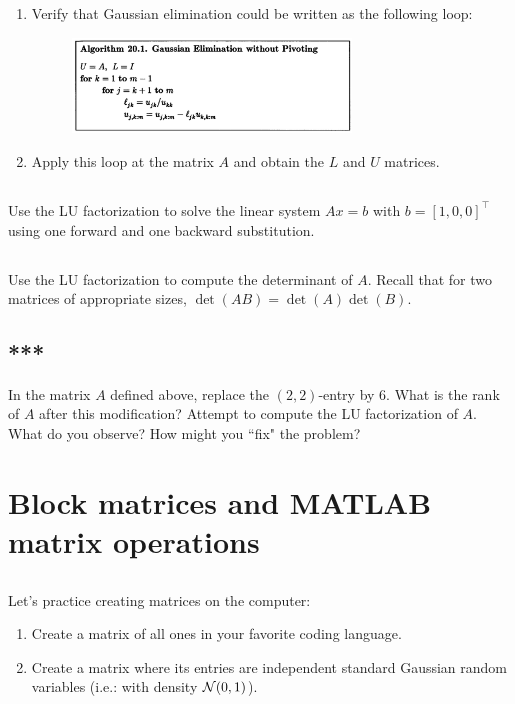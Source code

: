 \documentclass[11pt,letterpaper]{report}
\begin{document}
\begin{enumerate}
    \item Verify that Gaussian elimination could be written as the following loop:
    \begin{figure}[H]
        \centering
        \includegraphics[width = 0.7\textwidth]{Session_2/latex/figs/TB97_Guass_wo_piv}
    \end{figure}
    \item Apply this loop at the matrix $A$ and obtain the $L$ and $U$ matrices.
\end{enumerate}

\subsection{}
Use the LU factorization to solve the linear system $Ax=b$ with
  $b=[1, 0, 0]^\top$ using one forward and one backward substitution.
  
\subsection{}\label{sec:3.1d}
Use the LU factorization to compute the determinant of
$A$. Recall that for two matrices of appropriate sizes,
$\det(AB)=\det(A)\det(B)$.
  
\subsection{***}
In the matrix $A$ defined above, replace the $(2,2)$-entry by $6$.
What is the rank of $A$ after this modification?
Attempt to compute the LU factorization of $A$. 
What do you observe?
How might you ``fix" the problem?

\section{Block matrices and MATLAB matrix operations}
\subsection{}
Let's practice creating matrices on the computer:
\begin{enumerate}
    \item Create a matrix of all ones in your favorite coding language.
    \item Create a matrix where its entries are independent standard Gaussian random variables (i.e.: with density $\mathcal{N}(0,1)$). 
\end{enumerate}
\end{document}

